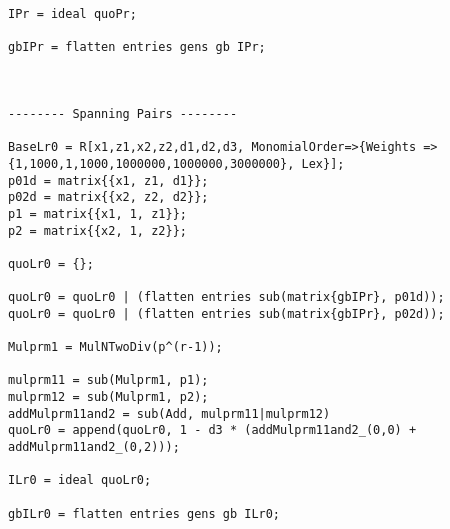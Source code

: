 \begin{lstlisting}
IPr = ideal quoPr;

gbIPr = flatten entries gens gb IPr;



-------- Spanning Pairs --------

BaseLr0 = R[x1,z1,x2,z2,d1,d2,d3, MonomialOrder=>{Weights => {1,1000,1,1000,1000000,1000000,3000000}, Lex}];
p01d = matrix{{x1, z1, d1}};
p02d = matrix{{x2, z2, d2}};
p1 = matrix{{x1, 1, z1}};
p2 = matrix{{x2, 1, z2}};

quoLr0 = {};

quoLr0 = quoLr0 | (flatten entries sub(matrix{gbIPr}, p01d));
quoLr0 = quoLr0 | (flatten entries sub(matrix{gbIPr}, p02d));

Mulprm1 = MulNTwoDiv(p^(r-1));

mulprm11 = sub(Mulprm1, p1);
mulprm12 = sub(Mulprm1, p2);
addMulprm11and2 = sub(Add, mulprm11|mulprm12)
quoLr0 = append(quoLr0, 1 - d3 * (addMulprm11and2_(0,0) + addMulprm11and2_(0,2)));

ILr0 = ideal quoLr0;

gbILr0 = flatten entries gens gb ILr0;
\end{lstlisting}
